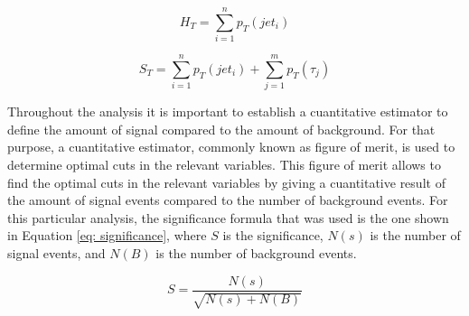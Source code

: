 \begin{equation}
 H_{T} = \sum_{i=1}^{n} p_{T}(jet_{i})
 \label{eq: HT}
\end{equation}

\begin{equation}
 S_{T} = \sum_{i=1}^{n} p_{T}(jet_{i}) + \sum_{j=1}^{m} p_{T}(\tau_{j})
 \label{eq: ST}
\end{equation}

Throughout the analysis it is important to establish a cuantitative estimator to define the amount of signal compared to the amount of background. For that purpose, a cuantitative estimator, commonly known as figure of merit, is used to determine optimal cuts in the relevant variables. This figure of merit allows to find the optimal cuts in the relevant variables by giving a cuantitative result of the amount of signal events compared to the number of background events. For this particular analysis, the significance formula that was used is the one shown in Equation \ref{eq: significance}, where $S$ is the significance, $N(s)$ is the number of signal events, and $N(B)$ is the number of background events.

\begin{equation} \label{eq: significance}
    S = \frac{N(s)}{\sqrt{N(s) + N(B)}}
\end{equation}






 



